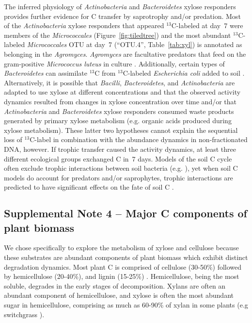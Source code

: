 \documentclass{article}
\begin{document}
The inferred physiology of \textit{Actinobacteria} and \textit{Bacteroidetes}
xylose responders provides further evidence for C transfer by
saprotrophy and/or predation. Most of the \textit{Actinobacteria} xylose
responders that appeared $^{13}$C-labeled at day~7 were members of the
\textit{Micrococcales} (Figure~\ref{fig:tiledtree}) and the most abundant
$^{13}$C-labeled \textit{Micrococcales} OTU at day~7 (“OTU.4”,
Table~\ref{tab:xyl}) is annotated as belonging in the \textit{Agromyces}.
\textit{Agromyces} are facultative predators that feed on the gram-positive
\textit{Micrococcus luteus} in culture \citep{16346402}. Additionally, certain types
of \textit{Bacteroidetes} can assimilate $^{13}$C from $^{13}$C-labeled
\textit{Escherichia coli} added to soil \citep{Lueders2006}.
Alternatively, it is possible that \textit{Bacilli},
\textit{Bacteroidetes}, and \textit{Actinobacteria} are adapted to use
xylose at different concentrations and that the observed activity dynamics
resulted from changes in xylose concentration over time and/or that
\textit{Actinobacteria} and \textit{Bacteroidetes} xylose responders
consumed waste products generated by primary xylose metabolism (e.g.
organic acids produced during xylose metabolism). These latter two
hypotheses cannot explain the sequential loss of $^{13}$C-label in combination
with the abundance dynamics in non-fractionated DNA, however.
If trophic transfer caused the activity dynamics, at least three different
ecological groups exchanged C in~7 days. Models of the soil C cycle often
exclude trophic interactions between soil bacteria (e.g.
\citep{Moore1988}), yet when soil C models do account for predators and/or
saprophytes, trophic interactions are predicted to have significant
effects on the fate of soil C \citep{Kaiser2014a}. 

\subsection{Supplemental Note 4 -- Major C components of plant biomass}
We chose specifically to explore the metabolism of xylose and cellulose because
these substrates are abundant components of plant biomass which exhibit
distinct degradation dynamics.  Most plant C is comprised of cellulose
(30-50\%) followed by hemicellulose (20-40\%), and lignin (15-25\%)
\citep{Lynd2002}. Hemicellulose, being the most soluble, degrades in the early
stages of decomposition. Xylans are often an abundant component of
hemicellulose, and xylose is often the most abundant sugar in hemicellulose,
comprising as much as 60-90\% of xylan in some plants (e.g  switchgrass
\citep{Bunnell2013}). 
\end{document}

